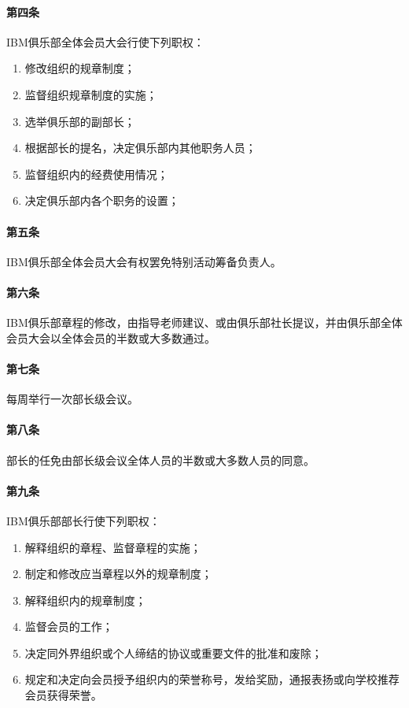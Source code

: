\documentclass{club}
\begin{document}
\paragraph{第四条}IBM俱乐部全体会员大会行使下列职权：
\begin{enumerate}
	\item 修改组织的规章制度；
	\item 监督组织规章制度的实施；
	\item 选举俱乐部的副部长；
	\item 根据部长的提名，决定俱乐部内其他职务人员；
	\item 监督组织内的经费使用情况；
	\item 决定俱乐部内各个职务的设置；
\end{enumerate}
\paragraph{第五条}IBM俱乐部全体会员大会有权罢免特别活动筹备负责人。
\paragraph{第六条}IBM俱乐部章程的修改，由指导老师建议、或由俱乐部社长提议，并由俱乐部全体会员大会以全体会员的半数或大多数通过。
\paragraph{第七条}每周举行一次部长级会议。
\paragraph{第八条}部长的任免由部长级会议全体人员的半数或大多数人员的同意。
\paragraph{第九条}IBM俱乐部部长行使下列职权：
\begin{enumerate}
	\item 解释组织的章程、监督章程的实施；
	\item 制定和修改应当章程以外的规章制度；
	\item 解释组织内的规章制度；
	\item 监督会员的工作；
	\item 决定同外界组织或个人缔结的协议或重要文件的批准和废除；
	\item 规定和决定向会员授予组织内的荣誉称号，发给奖励，通报表扬或向学校推荐会员获得荣誉。
\end{enumerate}
\end{document}
